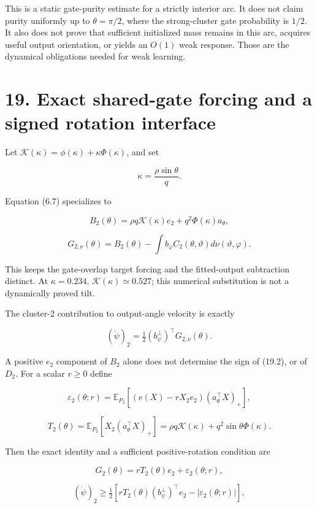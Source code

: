 \documentclass[
  10pt,
]{article}
\begin{document}
This is a static gate-purity estimate for a strictly interior arc. It
does not claim purity uniformly up to \(\theta=\pi/2\), where the
strong-cluster gate probability is \(1/2\). It also does not prove that
sufficient initialized mass remains in this arc, acquires useful output
orientation, or yields an \(O(1)\) weak response. Those are the
dynamical obligations needed for weak learning.

\section{19. Exact shared-gate forcing and a signed rotation
interface}\label{exact-shared-gate-forcing-and-a-signed-rotation-interface}

Let \(\mathcal K(\kappa)=\phi(\kappa)+\kappa\Phi(\kappa)\), and set

\[
 \kappa=\frac{\rho\sin\theta}{q}.
\]

Equation (6.7) specializes to

\[
 \boxed{B_2(\theta)=\rho q\mathcal K(\kappa)e_2
                        +q^2\Phi(\kappa)a_\theta,}
\]

\[
 G_{2,\nu}(\theta)=B_2(\theta)
             -\int b_\varphi C_2(\theta,\vartheta)d\nu(\vartheta,\varphi).
 \tag{19.1}
\]

This keeps the gate-overlap target forcing and the fitted-output
subtraction distinct. At \(\kappa=0.234\),
\(\mathcal K(\kappa)\simeq0.527\); this numerical substitution is not a
dynamically proved tilt.

The cluster-2 contribution to output-angle velocity is exactly

\[
 (\dot\psi)_2=\tfrac12(b_\psi^\perp)^\top G_{2,\nu}(\theta).
 \tag{19.2}
\]

A positive \(e_2\) component of \(B_2\) alone does not determine the
sign of (19.2), or of \(D_2\). For a scalar \(r\ge0\) define

\[
 \varepsilon_2(\theta;r)=
 \mathbb E_{P_2}[(e(X)-rX_2e_2)(a_\theta^\top X)_+],
\]

\[
 T_2(\theta)=\mathbb E_{P_2}[X_2(a_\theta^\top X)_+]
 =\rho q\mathcal K(\kappa)+q^2\sin\theta\Phi(\kappa).
\]

Then the exact identity and a sufficient positive-rotation condition are

\[
 G_2(\theta)=rT_2(\theta)e_2+\varepsilon_2(\theta;r),
\]

\[
 (\dot\psi)_2\ge\tfrac12
 [rT_2(\theta)(b_\psi^\perp)^\top e_2-|\varepsilon_2(\theta;r)|],
 \tag{19.3}
\]
\end{document}

